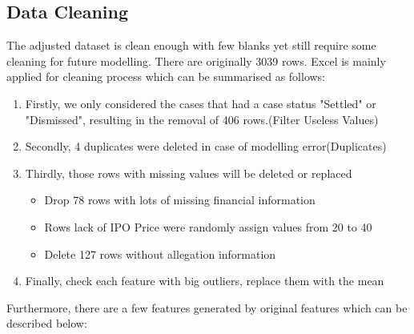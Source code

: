 \subsection{Data Cleaning}
The adjusted dataset is clean enough with few blanks yet still require some cleaning for future modelling. There are originally 3039 rows. Excel is mainly applied for cleaning process which can be summarised as follows:
\begin{enumerate}
   \item Firstly, we only considered the cases that had a case status "Settled" or "Dismissed", resulting in the removal of 406 rows.(Filter Useless Values)
   \item Secondly, 4 duplicates were deleted in case of modelling error(Duplicates)
   \item Thirdly, those rows with missing values will be deleted or replaced 
   \begin{itemize}
     \item Drop 78 rows with lots of missing financial information 
     \item Rows lack of IPO Price were randomly assign values from 20 to 40 
     \item Delete 127 rows without allegation information 
   \end{itemize}
   \item Finally, check each feature with big outliers, replace them with the mean 
\end{enumerate}
Furthermore, there are a few features generated by original features which can be described below:

